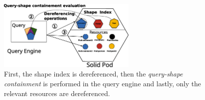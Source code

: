 \begin{figure}
    \centering
    \includegraphics[width=0.60\textwidth]{figure/shape_containement}
    \caption{First, the shape index is dereferenced, 
    then the \emph{query-shape containment} is performed in the query engine and lastly, only the relevant resources are dereferenced.}
    \label{fig:shape_index}
\end{figure}
